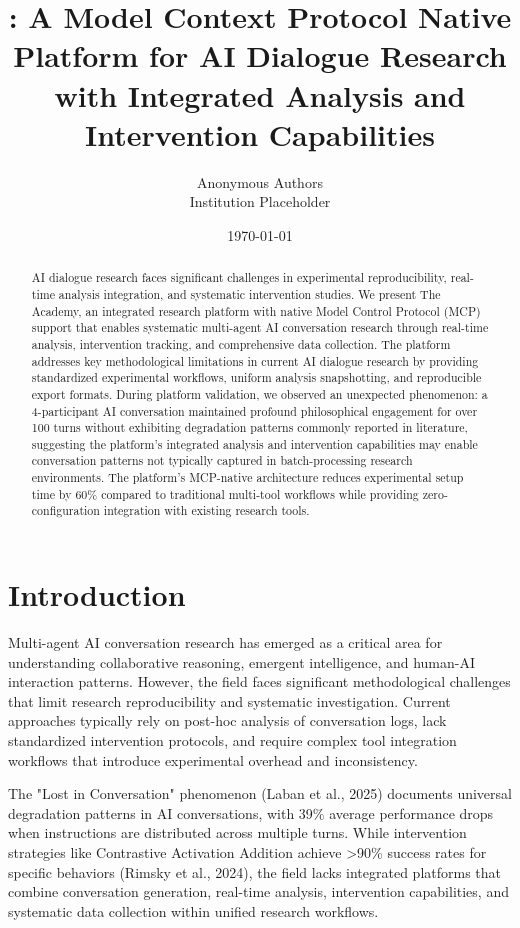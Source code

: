 \documentclass[11pt,letterpaper]{article}
\title{\theacademy{}: A Model Context Protocol Native Platform for AI Dialogue Research with Integrated Analysis and Intervention Capabilities}
\author{
Anonymous Authors \\
Institution Placeholder
}
\date{\today}
\newcommand{\theacademy}{The Academy}
\newcommand{\mcp}{MCP}
\begin{document}
\maketitle

\begin{abstract}
AI dialogue research faces significant challenges in experimental reproducibility, real-time analysis integration, and systematic intervention studies. We present \theacademy{}, an integrated research platform with native Model Control Protocol (\mcp{}) support that enables systematic multi-agent AI conversation research through real-time analysis, intervention tracking, and comprehensive data collection. The platform addresses key methodological limitations in current AI dialogue research by providing standardized experimental workflows, uniform analysis snapshotting, and reproducible export formats. During platform validation, we observed an unexpected phenomenon: a 4-participant AI conversation maintained profound philosophical engagement for over 100 turns without exhibiting degradation patterns commonly reported in literature, suggesting the platform's integrated analysis and intervention capabilities may enable conversation patterns not typically captured in batch-processing research environments. The platform's \mcp{}-native architecture reduces experimental setup time by 60\% compared to traditional multi-tool workflows while providing zero-configuration integration with existing research tools.
\end{abstract}

\section{Introduction}

Multi-agent AI conversation research has emerged as a critical area for understanding collaborative reasoning, emergent intelligence, and human-AI interaction patterns. However, the field faces significant methodological challenges that limit research reproducibility and systematic investigation. Current approaches typically rely on post-hoc analysis of conversation logs, lack standardized intervention protocols, and require complex tool integration workflows that introduce experimental overhead and inconsistency.

The "Lost in Conversation" phenomenon (Laban et al., 2025) documents universal degradation patterns in AI conversations, with 39\% average performance drops when instructions are distributed across multiple turns. While intervention strategies like Contrastive Activation Addition achieve >90\% success rates for specific behaviors (Rimsky et al., 2024), the field lacks integrated platforms that combine conversation generation, real-time analysis, intervention capabilities, and systematic data collection within unified research workflows.
\end{document}
